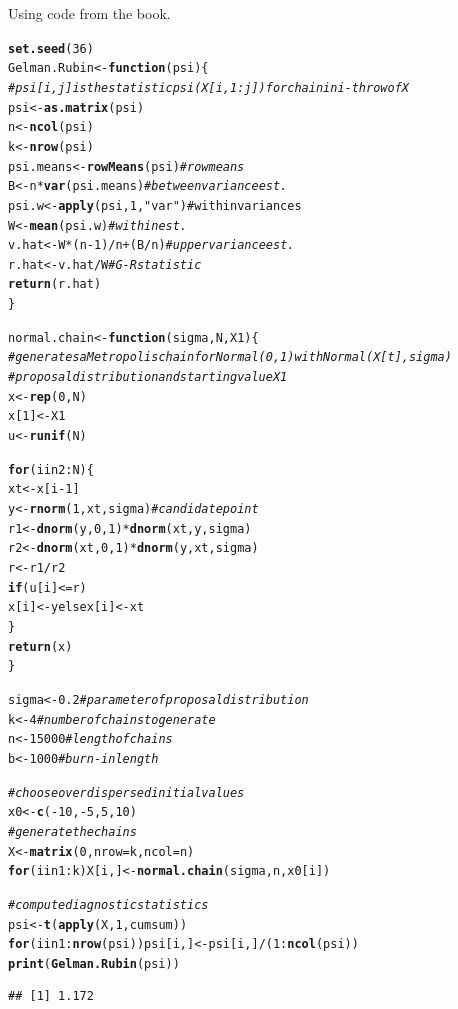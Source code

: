 \documentclass{article}\usepackage[]{graphicx}\usepackage[]{color}
\makeatletter
\newcommand{\hlstr}[1]{\textcolor[rgb]{0.192,0.494,0.8}{#1}}%
\newcommand{\hlcom}[1]{\textcolor[rgb]{0.678,0.584,0.686}{\textit{#1}}}%
\newcommand{\hlkwd}[1]{\textcolor[rgb]{0.737,0.353,0.396}{\textbf{#1}}}%
\newenvironment{kframe}{%
 \def\at@end@of@kframe{}%
 \ifinner\ifhmode%
  \def\at@end@of@kframe{\end{minipage}}%
  \begin{minipage}{\columnwidth}%
 \fi\fi%
 \def\FrameCommand##1{\hskip\@totalleftmargin \hskip-\fboxsep
 \colorbox{shadecolor}{##1}\hskip-\fboxsep
     \hskip-\linewidth \hskip-\@totalleftmargin \hskip\columnwidth}%
 \MakeFramed {\advance\hsize-\width
   \@totalleftmargin\z@ \linewidth\hsize
   \@setminipage}}%
 {\par\unskip\endMakeFramed%
 \at@end@of@kframe}
\newenvironment{knitrout}{}{} %
\makeatother
\begin{document}
\begin{itemize}
Using code from the book.
\begin{knitrout}
\color{fgcolor}\begin{kframe}
\begin{alltt}
\hlkwd{set.seed}(36)
Gelman.Rubin <- \hlkwd{function}(psi) \{
\hlcom{    # psi[i,j] is the statistic psi(X[i,1:j]) for chain in i-th row of X}
    psi <- \hlkwd{as.matrix}(psi)
    n <- \hlkwd{ncol}(psi)
    k <- \hlkwd{nrow}(psi)
    psi.means <- \hlkwd{rowMeans}(psi)  \hlcom{#row means}
    B <- n * \hlkwd{var}(psi.means)  \hlcom{#between variance est.}
    psi.w <- \hlkwd{apply}(psi, 1, \hlstr{"var"})  #within variances
    W <- \hlkwd{mean}(psi.w)  \hlcom{#within est.}
    v.hat <- W * (n - 1)/n + (B/n)  \hlcom{#upper variance est.}
    r.hat <- v.hat/W  \hlcom{#G-R statistic}
    \hlkwd{return}(r.hat)
\}

normal.chain <- \hlkwd{function}(sigma, N, X1) \{
\hlcom{    # generates a Metropolis chain for Normal(0,1) with Normal(X[t], sigma)}
\hlcom{    # proposal distribution and starting value X1}
    x <- \hlkwd{rep}(0, N)
    x[1] <- X1
    u <- \hlkwd{runif}(N)
    
    \hlkwd{for} (i in 2:N) \{
        xt <- x[i - 1]
        y <- \hlkwd{rnorm}(1, xt, sigma)  \hlcom{#candidate point}
        r1 <- \hlkwd{dnorm}(y, 0, 1) * \hlkwd{dnorm}(xt, y, sigma)
        r2 <- \hlkwd{dnorm}(xt, 0, 1) * \hlkwd{dnorm}(y, xt, sigma)
        r <- r1/r2
        \hlkwd{if} (u[i] <= r) 
            x[i] <- y else x[i] <- xt
    \}
    \hlkwd{return}(x)
\}

sigma <- 0.2  \hlcom{#parameter of proposal distribution}
k <- 4  \hlcom{#number of chains to generate}
n <- 15000  \hlcom{#length of chains}
b <- 1000  \hlcom{#burn-in length}

\hlcom{# choose overdispersed initial values}
x0 <- \hlkwd{c}(-10, -5, 5, 10)
\hlcom{# generate the chains}
X <- \hlkwd{matrix}(0, nrow = k, ncol = n)
\hlkwd{for} (i in 1:k) X[i, ] <- \hlkwd{normal.chain}(sigma, n, x0[i])

\hlcom{# compute diagnostic statistics}
psi <- \hlkwd{t}(\hlkwd{apply}(X, 1, cumsum))
\hlkwd{for} (i in 1:\hlkwd{nrow}(psi)) psi[i, ] <- psi[i, ]/(1:\hlkwd{ncol}(psi))
\hlkwd{print}(\hlkwd{Gelman.Rubin}(psi))
\end{alltt}
\begin{verbatim}
## [1] 1.172
\end{verbatim}
\end{kframe}
\end{knitrout}



\end{itemize}
\end{document}
